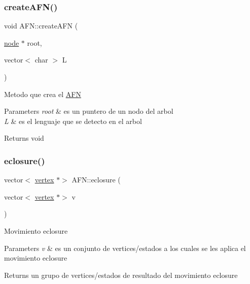 \subsubsection{\texorpdfstring{create\+A\+F\+N()}{createAFN()}}
{\footnotesize\ttfamily void A\+F\+N\+::create\+A\+FN (\begin{DoxyParamCaption}\item[{\hyperlink{structnode}{node} $\ast$}]{root,  }\item[{vector$<$ char $>$}]{L }\end{DoxyParamCaption})}

Metodo que crea el \hyperlink{class_a_f_n}{A\+FN} 
\begin{DoxyParams}{Parameters}
{\em root} & es un puntero de un nodo del arbol \\
\hline
{\em L} & es el lenguaje que se detecto en el arbol \\
\hline
\end{DoxyParams}
\begin{DoxyReturn}{Returns}
void 
\end{DoxyReturn}
\hypertarget{class_a_f_n_a7513af935008d76a552ba97d58138e52}{}\label{class_a_f_n_a7513af935008d76a552ba97d58138e52} 
\subsubsection{\texorpdfstring{eclosure()}{eclosure()}}
{\footnotesize\ttfamily vector$<$ \hyperlink{structvertex}{vertex} $\ast$$>$ A\+F\+N\+::eclosure (\begin{DoxyParamCaption}\item[{vector$<$ \hyperlink{structvertex}{vertex} $\ast$$>$}]{v }\end{DoxyParamCaption})}

Movimiento eclosure 
\begin{DoxyParams}{Parameters}
{\em v} & es un conjunto de vertices/estados a los cuales se les aplica el movimiento eclosure \\
\hline
\end{DoxyParams}
\begin{DoxyReturn}{Returns}
un grupo de vertices/estados de resultado del movimiento eclosure 
\end{DoxyReturn}
\hypertarget{class_a_f_n_a56f681d6589a75cf2b102d721af4fe89}{}\label{class_a_f_n_a56f681d6589a75cf2b102d721af4fe89} 
